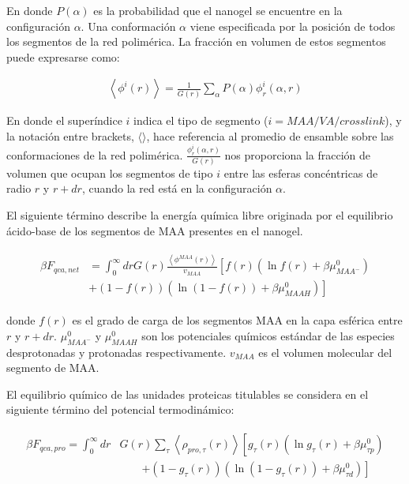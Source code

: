 \noindent En donde $P(\alpha)$ es la probabilidad que el nanogel se encuentre en la configuraci\'on $\alpha$.
Una conformaci\'on $\alpha$ viene especificada por la posici\'on de todos los segmentos de la red polim\'erica. 
La fracci\'on en volumen de estos segmentos puede expresarse como:

\begin{align}
	\left< \phi^i(r)\right> = \frac{1}{G(r)} \sum_\alpha{P(\alpha)\phi^i_r(\alpha,r)} 
	\label{eq:esf:ensamble-gel}
 \end{align}

En donde el super\'indice $i$ indica el tipo de segmento ($i = MAA/VA/crosslink$), y la notaci\'on entre brackets, $\langle \rangle$,   hace referencia al promedio de ensamble sobre las conformaciones de la red polim\'erica. 
$\frac{\phi^i_r(\alpha,r)}{G(r)}$  nos proporciona la fracci\'on de volumen que ocupan los segmentos de tipo $i$ entre las esferas conc\'entricas de radio $r$ y $r + dr$, cuando la red est\'a en la configuraci\'on $\alpha$.




El siguiente t\'ermino describe la energ\'ia qu\'imica libre originada por el equilibrio \'acido-base de los segmentos de MAA presentes en el nanogel.

\begin{align}
	\begin{aligned}
		\beta F_{qca,net} &= \int_0^\infty drG(r) \frac{\left<\phi^{MAA}(r)\right>}{v_{MAA}} \left[f(r)(\ln f(r)+ \beta\mu^0_{MAA^-})\right.\\
		&\left.+(1-f(r))(\ln (1-f(r))+\beta\mu^0_{MAAH})\right]    
	\end{aligned}
\end{align} 


\noindent donde $f(r)$ es el grado de carga de los segmentos MAA en la capa esf\'erica entre $r$ y $r + dr$.
$\mu^0_{MAA^-}$ y $\mu^0_{MAAH}$ son los potenciales qu\'imicos est\'andar de las especies desprotonadas y protonadas respectivamente. $v_{MAA}$ es el volumen molecular del segmento de MAA.



El equilibrio qu\'imico de las unidades proteicas titulables se considera en el siguiente t\'ermino del potencial termodin\'amico:

\begin{align}
	\begin{aligned}
		\beta F_{qca,pro} =\int_0^\infty dr &G(r) \sum_\tau \left<\rho_{pro,\tau}(r)\right> \left[g_\tau(r)(\ln g_\tau(r)+ \beta\mu^0_{\tau p})\right.\\
		&\qquad\left.+(1-g_\tau(r))(\ln (1-g_\tau(r))+\beta\mu^0_{\tau d})\right]
		\label{eq:esf:fca-pro}   
	\end{aligned}
\end{align} 


